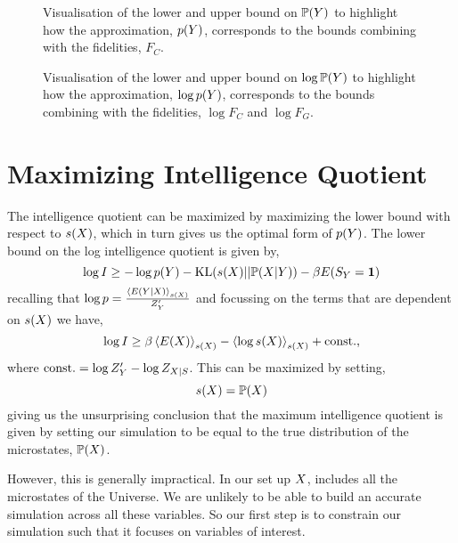 \documentclass[]{article}
\begin{document}
\begin{figure}
    \centering
    \def\svgwidth{\textwidth}
   
    \caption{Visualisation of the lower and upper bound on
      $\mathbb{P}(Y)$ to highlight how the approximation,
      $p(Y)$, corresponds to the bounds
      combining with the fidelities, $F_C$.}
    \label{fig-py-bounds}
\end{figure}



\begin{figure}
  \centering
  \def\svgwidth{\textwidth}
    
    \caption{Visualisation of the lower and upper bound on $\log
      \mathbb{P}(Y)$ to highlight how the approximation,
      $\log p(Y)$, corresponds to the bounds
      combining with the fidelities, $\log F_C$ and $\log F_G$.}
    \label{fig-log-py-bounds}
\end{figure}


\section{Maximizing Intelligence Quotient}

The intelligence quotient can be maximized by maximizing the lower bound with respect to $s(X)$, which in turn gives us the optimal form of $p(Y)$. The lower bound on the log intelligence quotient is given by,
\[
\log I \geq - \log p(Y) -\text{KL}(s(X)||\mathbb{P}(X|Y)) - \beta E(S_Y = \textbf{1})
\]
recalling that $\log p = \frac{\left\langle E(Y|X) \right\rangle_{s(X)}}{Z^\prime_Y}$ and focussing on the terms that are dependent on $s(X)$ we have,
\[
\log I \geq \beta \left\langle E(X) \right\rangle_{s(X)} - \left\langle \log s(X) \right\rangle_{s(X)} + \text{const.},
\]
where $\text{const.} = \log Z^\prime_Y - \log Z_{X|S}$. This can be maximized by setting,
\[
s(X) = \mathbb{P}(X)
\]
giving us the unsurprising conclusion that the maximum intelligence quotient is given by setting our simulation to be equal to the true distribution of the microstates, $\mathbb{P}(X)$. 

However, this is generally impractical. In our set up $X$, includes all the microstates of the Universe. We are unlikely to be able to build an accurate simulation across all these variables. So our first step is to constrain our simulation such that it focuses on variables of interest.
\end{document}
